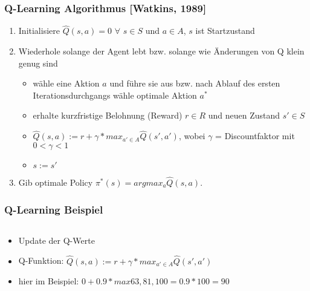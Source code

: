 \begin{frame}
  \frametitle{Q-Learning Algorithmus [Watkins, 1989]}
  \begin{enumerate}
    \item Initialisiere $\hat{Q}(s,a) = 0$ $\forall$ $s \in S$ und $a \in A$,
    $s$ ist Startzustand
    \item Wiederhole solange der Agent lebt bzw. solange wie Änderungen von Q
    klein genug sind
    \begin{itemize}
      \item wähle eine Aktion $a$ und führe sie aus bzw. nach Ablauf des ersten
      Iterationsdurchgangs wähle optimale Aktion $a^*$
      \item erhalte kurzfristige Belohnung (Reward) $r \in R$ und neuen Zustand
      $s' \in S$
      \item $\hat{Q}(s,a) := r + \gamma * max_{a' \in A}\hat{Q}(s',a')$,
      wobei $\gamma$ = Discountfaktor mit  $0 < \gamma < 1$
      \item $s := s'$
    \end{itemize}
    \item Gib optimale Policy  $\pi^*(s) = argmax_{a}\hat{Q}(s,a)$.
  \end{enumerate}  
\end{frame}

\begin{frame}
  \frametitle{Q-Learning Beispiel}
  \begin{columns}[b]
  \end{columns}  
  \begin{itemize}
    \item Update der Q-Werte
    \item Q-Funktion: $\hat{Q}(s,a) := r + \gamma * max_{a' \in
    A}\hat{Q}(s',a')$ 
    \item hier im Beispiel: $0 + 0.9*max{63,81,100} = 0.9*100 = 90$
  \end{itemize}
\end{frame}